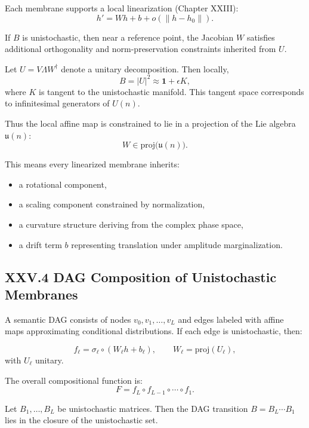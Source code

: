 \documentclass[11pt,letterpaper]{article}
\begin{document}
Each membrane supports a local linearization (Chapter XXIII):
\[
h' = W h + b + o(\|h - h_0\|).
\]

If $B$ is unistochastic, then near a reference point, the Jacobian $W$ satisfies additional orthogonality and norm-preservation constraints inherited from $U$.

Let $U = V \Lambda W^\dagger$ denote a unitary decomposition. Then locally,
\[
B = |U|^2 \approx \mathbf{1} + \epsilon K,
\]
where $K$ is tangent to the unistochastic manifold. This tangent space corresponds to infinitesimal generators of $U(n)$.

Thus the local affine map is constrained to lie in a projection of the Lie algebra $\mathfrak{u}(n)$:
\[
W \in \mathrm{proj}\big(\mathfrak{u}(n)\big).
\]

This means every linearized membrane inherits:

\begin{itemize}
    \item a rotational component,
    \item a scaling component constrained by normalization,
    \item a curvature structure deriving from the complex phase space,
    \item a drift term $b$ representing translation under amplitude marginalization.
\end{itemize}

\subsection{XXV.4 DAG Composition of Unistochastic Membranes}

A semantic DAG consists of nodes $v_0, v_1, \dots, v_L$ and edges labeled with affine maps approximating conditional distributions. If each edge is unistochastic, then:

\[
f_\ell = \sigma_\ell \circ (W_\ell h + b_\ell), \qquad
W_\ell = \mathrm{proj}(U_\ell),
\]
with $U_\ell$ unitary.

The overall compositional function is:
\[
F = f_L \circ f_{L-1} \circ \cdots \circ f_1.
\]

\begin{theorem}
Let $B_1, \dots, B_L$ be unistochastic matrices.  
Then the DAG transition $B = B_L \cdots B_1$ lies in the closure of the unistochastic set.
\end{theorem}
\end{document}
